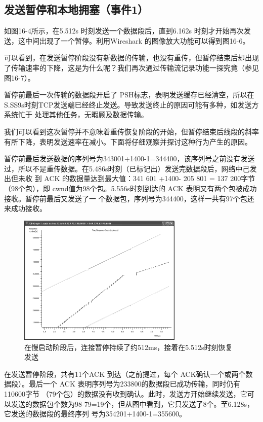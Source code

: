 \subsection{发送暂停和本地拥塞（事件1）}

如图16-4所示，在5.512s 时刻发送一个数据段后，直到6.162s 时刻才开始再次发送，这中间出现了一个暂停。利用Wireshark 的图像放大功能可以得到图16-6。

可以看到，在发送暂停阶段没有新数据的传输，也没有重传，但暂停结束后却出现了传输速率的下降，这是为什么呢？我们再次通过传输流记录功能一探究竟（参见图16-7）。

暂停前最后一次传输的数据段开启了 PSH标志，表明发送缓存已经清空，所以在S.SS9s时刻TCP发送端已经终止发送。导致发送终止的原因可能有多种，如发送方系统忙于
处理其他任务，无暇顾及数据传输。

我们可以看到这次暂停并不意味着重传恢复阶段的开始，但暂停结束后线段的斜率有所下降，表明发送速率在减小。下面将仔细观察并探讨这种行为产生的原因。

暂停前最后发送数据的序列号为343001+1400-1=344400，该序列号之前没有发送过，所以不是重传数据。在5.486s时刻（已标记出）发送完数据段后，网络中己发出但未收
到 ACK 的数据量达到最大值：341 601 +1400- 205 801 = 137 200字节（98个包），即 cwnd值为98个包。5.556s时刻到达的 ACK 表明又有两个包被成功接收。暂停前最后又发送了一
个数据包，序列号为344400，这样一共有97个包还来成功接收。

\begin{figure}[!htb]
    \centering
	\includegraphics[width=0.7\textwidth]{imgs/16/16-6.png}
	\caption{在慢启动阶段后，连接暂停持续了约512ms，接着在5.512s时刻恢复发送}
\end{figure}


在发送暂停阶段，共有11个ACK 到达（之前提过，每个 ACK确认一个或两个数据段）。最后一个 ACK 表明序列号为233800的数据段已成功传输，同时仍有110600字节
（79个包）的数据没有收到确认。此时，发送方开始继续发送，它可以发送的数据包个数为98-79=19个，但从图中看到，它只发送了8个。至6.128s，它发送的数据段的最终序列
号为354201+1400-1=355600。

